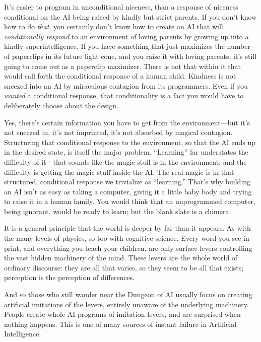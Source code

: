 {
 It's easier to program in unconditional niceness,
than a response of niceness conditional on the AI being raised by
kindly but strict parents. If you don't know how to do
\textit{that}, you certainly don't know how to create
an AI that will \textit{conditionally respond} to an environment of
loving parents by growing up into a kindly superintelligence. If you
have something that just maximizes the number of paperclips in its
future light cone, and you raise it with loving parents,
it's still going to come out as a paperclip maximizer.
There is not that within it that would call forth the conditional
response of a human child. Kindness is not sneezed into an AI by
miraculous contagion from its programmers. Even if you \textit{wanted}
a conditional response, that conditionality is a fact you would have to
deliberately choose about the design.}

{
 Yes, there's certain information you have to get
from the environment---but it's not sneezed in,
it's not imprinted, it's not absorbed
by magical contagion. Structuring that conditional response to the
environment, so that the AI ends up in the desired state, is itself the
major problem. ``Learning'' far
understates the difficulty of it---that sounds like the magic stuff is
in the environment, and the difficulty is getting the magic stuff
inside the AI. The real magic is in that structured, conditional
response we trivialize as
``learning.'' That's
why building an AI isn't as easy as taking a computer,
giving it a little baby body and trying to raise it in a human family.
You would think that an unprogrammed computer, being ignorant, would be
ready to learn; but the blank slate is a chimera.}

{
 It is a general principle that the world is deeper by far than it
appears. As with the many levels of physics, so too with cognitive
science. Every word you see in print, and everything you teach your
children, are only surface levers controlling the vast hidden machinery
of the mind. These levers are the whole world of ordinary discourse:
they are all that varies, so they seem to be all that exists;
perception is the perception of differences.}

{
 And so those who still wander near the Dungeon of AI usually focus
on creating artificial imitations of the levers, entirely unaware of
the underlying machinery. People create whole AI programs of imitation
levers, and are surprised when nothing happens. This is one of many
sources of instant failure in Artificial Intelligence.}

